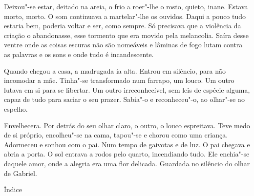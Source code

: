 Deixou"-se estar, deitado na areia, o frio a roer"-lhe o rosto, quieto,
inane. Estava morto, morto. O som continuava a martelar"-lhe os ouvidos.
Daqui a pouco tudo estaria bem, poderia voltar e ser, como sempre. Só
precisava que a violência da criação o abandonasse, esse tormento que
era movido pela melancolia. Saíra desse ventre onde as coisas escuras
não são nomeáveis e lâminas de fogo lutam contra as palavras e os sons e
onde tudo é incandescente.

Quando chegou a casa, a madrugada ia alta. Entrou em silêncio, para não
incomodar a mãe. Tinha"-se transformado num farrapo, um louco. Um outro
lutava em si para se libertar. Um outro irreconhecível, sem leis de
espécie alguma, capaz de tudo para saciar o seu prazer. Sabia"-o e
reconheceu"-o, ao olhar"-se ao espelho.

Envelhecera. Por detrás do seu olhar claro, o outro, o louco espreitava.
Teve medo de si próprio, encolheu"-se na cama, tapou"-se e chorou como uma
criança. Adormeceu e sonhou com o pai. Num tempo de gaivotas e de luz. O
pai chegava e abria a porta. O sol entrava a rodos pelo quarto,
incendiando tudo. Ele enchia"-se daquele amor, onde a alegria era uma
flor delicada. Guardada no silêncio do olhar de Gabriel.

Índice
